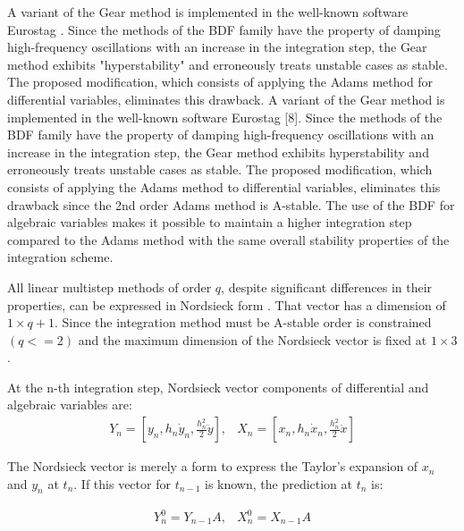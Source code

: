 \documentclass[lettersize,journal]{IEEEtran}
\begin{document}
A variant of the Gear method is implemented in the well-known software Eurostag \cite{mixedadams}. Since the methods of the BDF family have the property of damping high-frequency oscillations with an increase in the integration step, the Gear method exhibits "hyperstability" and erroneously treats unstable cases as stable. The proposed modification, which consists of applying the Adams method for differential variables, eliminates this drawback. A variant of the Gear method is implemented in the well-known software Eurostag [8]. Since the methods of the BDF family have the property of damping high-frequency oscillations with an increase in the integration step, the Gear method exhibits hyperstability and erroneously treats unstable cases as stable. The proposed modification, which consists of applying the Adams method to differential variables, eliminates this drawback since the 2nd order Adams method is A-stable. The use of the BDF for algebraic variables makes it possible to maintain a higher integration step compared to the Adams method with the same overall stability properties of the integration scheme.

All linear multistep methods of order \(q\), despite significant differences in their properties, can be expressed in Nordsieck form \cite{hairer93}. That vector has a dimension of \(1 \times q+1\). Since the integration method must be A-stable order is constrained \((q<=2)\) and the maximum dimension of the Nordsieck vector is fixed at \(1 \times 3\). 

At the n-th integration step, Nordsieck vector components of differential and algebraic variables are:
\begin{equation}
	\label{eqn_nords}
	\begin{array}{cc}
		Y_n=\left[y_n, h_n \dot{y}_n, \frac{h_n^2}{2} \ddot{y}\right], &
		X_n=\left[x_n, h_n \dot{x}_n, \frac{h_n^2}{2} \ddot{x}\right] 
	\end{array}
\end{equation}

The Nordsieck vector is merely a form to express the Taylor's expansion of \(x_n\) and \(y_n\) at \(t_n\). If this vector for \(t_{n-1}\) is known, the prediction at \(t_n\) is:

\begin{equation}
	\label{eqn_predictor}
	\begin{array}{cc}
		Y_n^0=Y_{n-1}A, &
		X_n^0=X_{n-1}A
	\end{array}
\end{equation}
\end{document}
